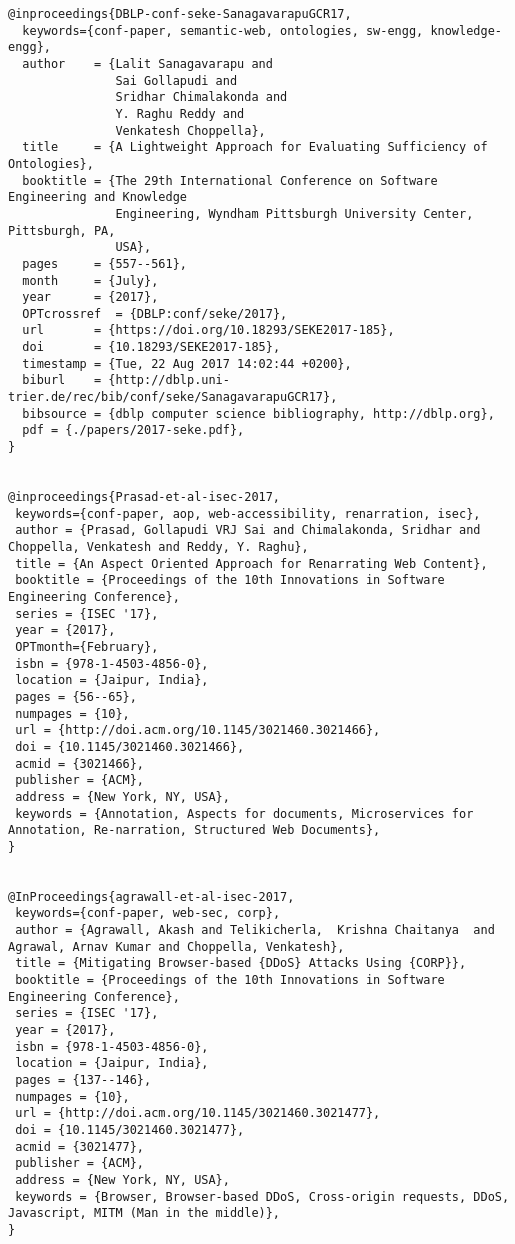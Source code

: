 \documentclass[11pt]{article}
\begin{document}
\begin{lstlisting}
@inproceedings{DBLP-conf-seke-SanagavarapuGCR17,
  keywords={conf-paper, semantic-web, ontologies, sw-engg, knowledge-engg},
  author    = {Lalit Sanagavarapu and
               Sai Gollapudi and
               Sridhar Chimalakonda and
               Y. Raghu Reddy and
               Venkatesh Choppella},
  title     = {A Lightweight Approach for Evaluating Sufficiency of Ontologies},
  booktitle = {The 29th International Conference on Software Engineering and Knowledge
               Engineering, Wyndham Pittsburgh University Center, Pittsburgh, PA,
               USA},
  pages     = {557--561},
  month     = {July},
  year      = {2017},
  OPTcrossref  = {DBLP:conf/seke/2017},
  url       = {https://doi.org/10.18293/SEKE2017-185},
  doi       = {10.18293/SEKE2017-185},
  timestamp = {Tue, 22 Aug 2017 14:02:44 +0200},
  biburl    = {http://dblp.uni-trier.de/rec/bib/conf/seke/SanagavarapuGCR17},
  bibsource = {dblp computer science bibliography, http://dblp.org},
  pdf = {./papers/2017-seke.pdf},
} 


@inproceedings{Prasad-et-al-isec-2017,
 keywords={conf-paper, aop, web-accessibility, renarration, isec},
 author = {Prasad, Gollapudi VRJ Sai and Chimalakonda, Sridhar and Choppella, Venkatesh and Reddy, Y. Raghu},
 title = {An Aspect Oriented Approach for Renarrating Web Content},
 booktitle = {Proceedings of the 10th Innovations in Software Engineering Conference},
 series = {ISEC '17},
 year = {2017},
 OPTmonth={February},
 isbn = {978-1-4503-4856-0},
 location = {Jaipur, India},
 pages = {56--65},
 numpages = {10},
 url = {http://doi.acm.org/10.1145/3021460.3021466},
 doi = {10.1145/3021460.3021466},
 acmid = {3021466},
 publisher = {ACM},
 address = {New York, NY, USA},
 keywords = {Annotation, Aspects for documents, Microservices for Annotation, Re-narration, Structured Web Documents},
}


@InProceedings{agrawall-et-al-isec-2017,
 keywords={conf-paper, web-sec, corp},
 author = {Agrawall, Akash and Telikicherla,  Krishna Chaitanya  and Agrawal, Arnav Kumar and Choppella, Venkatesh},
 title = {Mitigating Browser-based {DDoS} Attacks Using {CORP}},
 booktitle = {Proceedings of the 10th Innovations in Software Engineering Conference},
 series = {ISEC '17},
 year = {2017},
 isbn = {978-1-4503-4856-0},
 location = {Jaipur, India},
 pages = {137--146},
 numpages = {10},
 url = {http://doi.acm.org/10.1145/3021460.3021477},
 doi = {10.1145/3021460.3021477},
 acmid = {3021477},
 publisher = {ACM},
 address = {New York, NY, USA},
 keywords = {Browser, Browser-based DDoS, Cross-origin requests, DDoS, Javascript, MITM (Man in the middle)},
}


\end{lstlisting}
\end{document}
